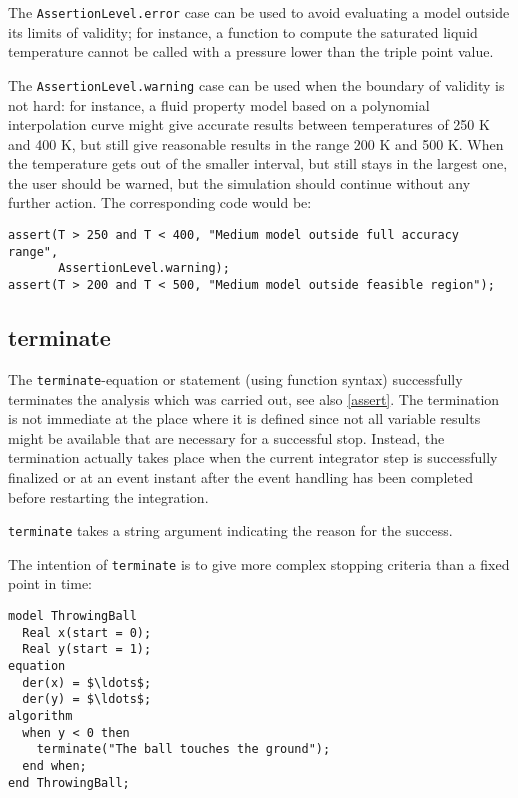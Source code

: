 \begin{nonnormative}
The \lstinline!AssertionLevel.error! case can be used to avoid evaluating a model outside its limits of validity; for instance, a function to compute the saturated liquid temperature cannot be called with a pressure lower than the triple point value.

The \lstinline!AssertionLevel.warning! case can be used when the boundary of validity is not hard: for instance, a fluid property model based on a polynomial interpolation curve might give accurate results between temperatures of 250 K and 400 K, but still give reasonable results in the range 200 K and 500 K.
When the temperature gets out of the smaller interval, but still stays in the largest one, the user should be warned, but the simulation should continue without any further action.
The corresponding code would be:
\begin{lstlisting}[language=modelica]
assert(T > 250 and T < 400, "Medium model outside full accuracy range",
       AssertionLevel.warning);
assert(T > 200 and T < 500, "Medium model outside feasible region");
\end{lstlisting}
\end{nonnormative}

\subsection{terminate}\label{terminate}

The \lstinline!terminate!-equation or statement (using function syntax) successfully terminates the analysis which was carried out, see also \cref{assert}.
The termination is not immediate at the place where it is defined since not all variable results might be available that are necessary for a successful stop.
Instead, the termination actually takes place when the current integrator step is successfully finalized or at an event instant after the event handling has been completed before restarting the integration.

\lstinline!terminate! takes a string argument indicating the reason for the success.

\begin{example}
The intention of \lstinline!terminate! is to give more complex stopping criteria than a fixed point in time:
\begin{lstlisting}[language=modelica]
model ThrowingBall
  Real x(start = 0);
  Real y(start = 1);
equation
  der(x) = $\ldots$;
  der(y) = $\ldots$;
algorithm
  when y < 0 then
    terminate("The ball touches the ground");
  end when;
end ThrowingBall;
\end{lstlisting}
\end{example}

